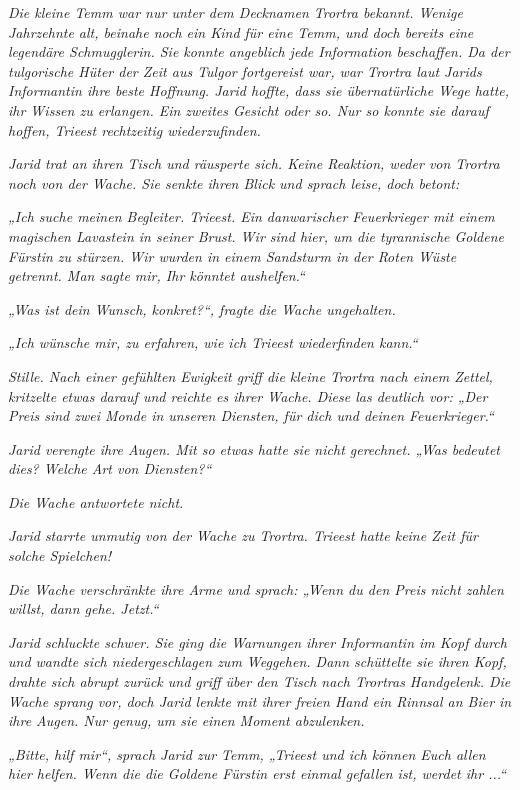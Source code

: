 \textit{Die kleine Temm war nur unter dem Decknamen Trortra bekannt. Wenige Jahrzehnte alt, beinahe noch ein Kind für eine Temm, und doch bereits eine legendäre Schmugglerin. Sie konnte angeblich jede Information beschaffen. Da der tulgorische Hüter der Zeit aus Tulgor fortgereist war, war Trortra laut Jarids Informantin ihre beste Hoffnung. Jarid hoffte, dass sie übernatürliche Wege hatte, ihr Wissen zu erlangen. Ein zweites Gesicht oder so. Nur so konnte sie darauf hoffen, Trieest rechtzeitig wiederzufinden.}

\textit{Jarid trat an ihren Tisch und räusperte sich. Keine Reaktion, weder von Trortra noch von der Wache. Sie senkte ihren Blick und sprach leise, doch betont:}

\textit{„Ich suche meinen Begleiter. Trieest. Ein danwarischer Feuerkrieger mit einem magischen Lavastein in seiner Brust. Wir sind hier, um die tyrannische Goldene Fürstin zu stürzen. Wir wurden in einem Sandsturm in der Roten Wüste getrennt. Man sagte mir, Ihr könntet aushelfen.“}

\textit{„Was ist dein Wunsch, konkret?“, fragte die Wache ungehalten.}

\textit{„Ich wünsche mir, zu erfahren, wie ich Trieest wiederfinden kann.“}

\textit{Stille. Nach einer gefühlten Ewigkeit griff die kleine Trortra nach einem Zettel, kritzelte etwas darauf und reichte es ihrer Wache. Diese las deutlich vor: „Der Preis sind zwei Monde in unseren Diensten, für dich und deinen Feuerkrieger.“}

\textit{Jarid verengte ihre Augen. Mit so etwas hatte sie nicht gerechnet. „Was bedeutet dies? Welche Art von Diensten?“}

\textit{Die Wache antwortete nicht.}

\textit{Jarid starrte unmutig von der Wache zu Trortra. Trieest hatte keine Zeit für solche Spielchen!}

\textit{Die Wache verschränkte ihre Arme und sprach: „Wenn du den Preis nicht zahlen willst, dann gehe. Jetzt.“}

\textit{Jarid schluckte schwer. Sie ging die Warnungen ihrer Informantin im Kopf durch und wandte sich niedergeschlagen zum Weggehen. Dann schüttelte sie ihren Kopf, drahte sich abrupt zurück und griff über den Tisch nach Trortras Handgelenk. Die Wache sprang vor, doch Jarid lenkte mit ihrer freien Hand ein Rinnsal an Bier in ihre Augen. Nur genug, um sie einen Moment abzulenken.}

\textit{„Bitte, hilf mir“, sprach Jarid zur Temm, „Trieest und ich können Euch allen hier helfen. Wenn die die Goldene Fürstin erst einmal gefallen ist, werdet ihr ...“}

